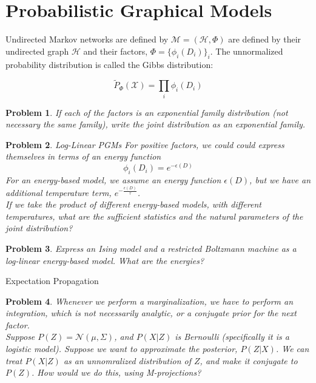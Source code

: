 \documentclass[a4paper]{article}
\newtheorem{problem}{Problem}[section]
\begin{document}
\section{Probabilistic Graphical Models}

Undirected Markov networks are defined by $\mathcal{M} = \left( \mathcal{H}, \Phi \right) $ are defined by their undirected graph $\mathcal{H}$ and their factors, $\Phi = \{ \phi_i(D_i) \}_i$.  
The unnormalized probability distribution is called the Gibbs distribution:

\begin{equation}
  \tilde{P}_\Phi(\mathcal{X}) = \prod_i \phi_i(D_i)
  \label{Gibbs distribution}
\end{equation}

\begin{problem}
  If each of the factors is an exponential family distribution (not necessary the same family), write the joint distribution as an exponential family.  \\
\end{problem}

\begin{problem} Log-Linear PGMs
  For positive factors, we could could express themselves in terms of an energy function
  \begin{equation}
    \phi_i(D_i) = e^{ - \epsilon(D)}
    \label{EBM}
  \end{equation}
  For an energy-based model, we assume an energy function $\epsilon(D)$, but we have an additional temperature term, $e^{-\frac{\epsilon(D)}{\tau}}$. \\
  If we take the product of different energy-based models, with different temperatures, what are the sufficient statistics and the natural parameters of the joint distribution?
\end{problem}

\begin{problem}
  Express an Ising model and a restricted Boltzmann machine as a log-linear energy-based model.  What are the energies?  
\end{problem}

Expectation Propagation
\begin{problem}
  Whenever we perform a marginalization, we have to perform an integration, which is not necessarily analytic, or a conjugate prior for the next factor. \\
  Suppose $P(Z) = \mathcal{N}(\mu,\Sigma)$, and $P(X \vert Z)$ is Bernoulli (specifically it is a logistic model).  Suppose we want to approximate the posterior, $P(Z \vert X)$.  We can treat $P(X \vert Z)$ as an unnomralized distribution of $Z$, and make it conjugate to $P(Z)$.  How would we do this, using M-projections?  \\
\end{problem}
\end{document}
